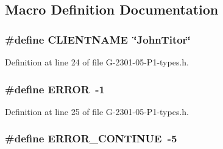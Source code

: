 \subsection{Macro Definition Documentation}
\hypertarget{_g-2301-05-_p1-types_8h_adcbfe6360d17dafe707c6e9c28ed93e8}{
\subsubsection[{C\-L\-I\-E\-N\-T\-N\-A\-M\-E}]{\setlength{\rightskip}{0pt plus 5cm}\#define C\-L\-I\-E\-N\-T\-N\-A\-M\-E~\char`\"{}John\-Titor\char`\"{}}}\label{_g-2301-05-_p1-types_8h_adcbfe6360d17dafe707c6e9c28ed93e8}


Definition at line 24 of file G-\/2301-\/05-\/\-P1-\/types.\-h.

\hypertarget{_g-2301-05-_p1-types_8h_a8fe83ac76edc595f6b98cd4a4127aed5}{
\subsubsection[{E\-R\-R\-O\-R}]{\setlength{\rightskip}{0pt plus 5cm}\#define E\-R\-R\-O\-R~-\/1}}\label{_g-2301-05-_p1-types_8h_a8fe83ac76edc595f6b98cd4a4127aed5}


Definition at line 25 of file G-\/2301-\/05-\/\-P1-\/types.\-h.

\hypertarget{_g-2301-05-_p1-types_8h_aac15417c9e9b175879f9621525227de1}{
\subsubsection[{E\-R\-R\-O\-R\-\_\-\-C\-O\-N\-T\-I\-N\-U\-E}]{\setlength{\rightskip}{0pt plus 5cm}\#define E\-R\-R\-O\-R\-\_\-\-C\-O\-N\-T\-I\-N\-U\-E~-\/5}}\label{_g-2301-05-_p1-types_8h_aac15417c9e9b175879f9621525227de1}


